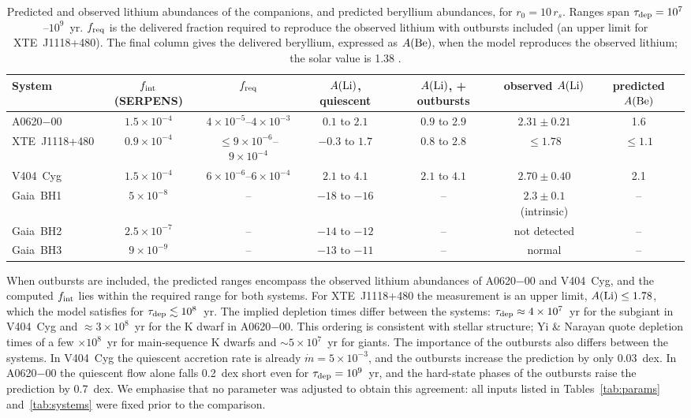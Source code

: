 \documentclass[twocolumn,showpacs,preprintnumbers,amsmath,amssymb]{revtex4}
\begin{document}
\begin{table}[t]
\caption{\label{tab:results} Predicted and observed lithium abundances of the companions, and predicted beryllium abundances, for $r_0 = 10\,r_s$. Ranges span $\tau_{\rm dep} = 10^7$--$10^9$~yr. $f_{\rm req}$ is the delivered fraction required to reproduce the observed lithium with outbursts included (an upper limit for XTE~J1118+480). The final column gives the delivered beryllium, expressed as $A({\rm Be})$, when the model reproduces the observed lithium; the solar value is 1.38 \cite{Asplund2009}.}
\begin{ruledtabular}
\begin{tabular}{lcccccc}
System & $f_{\rm int}$ (SERPENS) & $f_{\rm req}$ & $A({\rm Li})$, quiescent & $A({\rm Li})$, + outbursts & observed $A({\rm Li})$ & predicted $A({\rm Be})$ \\
\hline
A0620$-$00 & $1.5\times10^{-4}$ & $4\times10^{-5}$--$4\times10^{-3}$ & $0.1$ to $2.1$ & $0.9$ to $2.9$ & $2.31\pm0.21$ & 1.6 \\
XTE~J1118+480 & $0.9\times10^{-4}$ & $\le 9\times10^{-6}$--$9\times10^{-4}$ & $-0.3$ to $1.7$ & $0.8$ to $2.8$ & $\le1.78$ & $\le1.1$ \\
V404~Cyg & $1.5\times10^{-4}$ & $6\times10^{-6}$--$6\times10^{-4}$ & $2.1$ to $4.1$ & $2.1$ to $4.1$ & $2.70\pm0.40$ & 2.1 \\
Gaia~BH1 & $5\times10^{-8}$ & -- & $-18$ to $-16$ & -- & $2.3\pm0.1$ (intrinsic) & -- \\
Gaia~BH2 & $2.5\times10^{-7}$ & -- & $-14$ to $-12$ & -- & not detected & -- \\
Gaia~BH3 & $9\times10^{-9}$ & -- & $-13$ to $-11$ & -- & normal & -- \\
\end{tabular}
\end{ruledtabular}
\end{table}

When outbursts are included, the predicted ranges encompass the observed lithium abundances of A0620$-$00 and V404~Cyg, and the computed $f_{\rm int}$ lies within the required range for both systems. For XTE~J1118+480 the measurement is an upper limit, $A({\rm Li})\le1.78$, which the model satisfies for $\tau_{\rm dep}\lesssim10^{8}$~yr. The implied depletion times differ between the systems: $\tau_{\rm dep}\approx4\times10^{7}$~yr for the subgiant in V404~Cyg and $\approx3\times10^{8}$~yr for the K dwarf in A0620$-$00. This ordering is consistent with stellar structure; Yi \& Narayan \cite{YiNarayan1997} quote depletion times of a few $\times10^{8}$~yr for main-sequence K dwarfs and $\sim5\times10^{7}$~yr for giants. The importance of the outbursts also differs between the systems. In V404~Cyg the quiescent accretion rate is already $\dot m = 5\times10^{-3}$, and the outbursts increase the prediction by only 0.03~dex. In A0620$-$00 the quiescent flow alone falls 0.2~dex short even for $\tau_{\rm dep} = 10^{9}$~yr, and the hard-state phases of the outbursts raise the prediction by 0.7~dex. We emphasise that no parameter was adjusted to obtain this agreement: all inputs listed in Tables~\ref{tab:params} and~\ref{tab:systems} were fixed prior to the comparison.
\end{document}
